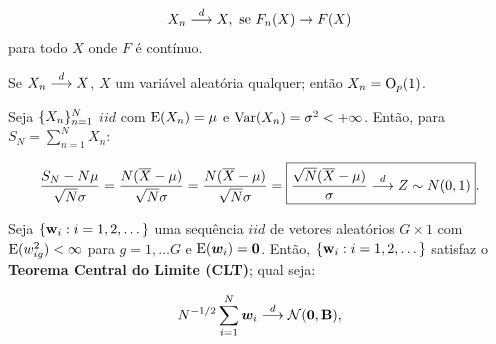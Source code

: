 \documentclass[11pt, oneside, a4paper, article]{article}
\numberwithin{equation}{section}
\begin{document}
\begin{description}
\begin{defn}
	\vspace{-1 em}
	\begin{align*}
		X_{n}  \overset{d}{\longrightarrow}  X, \text{ se } F_{n}(X) \to F(X)
	\end{align*}
	\noindent
	para todo $X$ onde $F$ é contínuo.
\end{defn}

\begin{lem}
	\citet[Lemma 3.5, p.39]{wool-2010}

	Se $X_{n}  \overset{d}{\longrightarrow}  X$, $X$ um variável aleatória qualquer; então $X_{n} = \text{O}_{p}(1)$.
\end{lem}

\begin{defn} \label{def:tcl}

	Seja $\{X_{n}\}_{n = 1}^{N}$ $iid$ com $\text{E}(X_{n}) = \mu$ e $\text{Var}(X_{n}) = \sigma^{2} < + \infty$.
	Então, para $S_{N} = \sum_{n=1}^{N} X_{n}$:

	\begin{align*}
		\frac{S_{N} - N \mu }{ \sqrt{N} \sigma}
		=
		\frac{N ( \overline{X} - \mu ) }{ \sqrt{N} \sigma}
		=
		\frac{N ( \overline{X} - \mu ) }{ \sqrt{N} \sigma}
		=
		\boxed{
			\frac{\sqrt{N} ( \overline{X} - \mu ) }{\sigma}
		 \overset{d}{\longrightarrow}  Z \sim N(0,1)}.
	\end{align*}
\end{defn}

\begin{teo} \label{def:tcl:vec}
	\citet[Teo 3.2, p.40]{wool-2010}

	Seja $\{\mathbf{w}_{i}:i=1,2,\dots\}$ uma sequência $iid$ de vetores aleatórios $G \times 1$ com
	$\text{E}( w_{ig}^{2} ) < \infty$ para $g= 1, \dots G$ 
	e
	$\text{E}( \boldsymbol{w}_{i} ) = \boldsymbol{0}$.
	Então, $\{\mathbf{w}_{i}:i=1,2,\dots\}$ satisfaz o \textbf{Teorema Central do Limite (CLT)}; 
	qual seja:

	\vspace{-1 em}
	\begin{align*}
		N^{-1/2} \sum_{i=1}^{N} \boldsymbol{w}_{i}  \overset{d}{\longrightarrow}  \mathcal{N}(\boldsymbol{0}, \mathbf{B}),
	\end{align*}


\end{teo}
\end{description}
\end{document}
